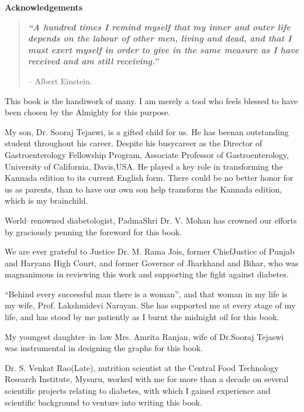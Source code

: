 \thispagestyle{empty}

\begin{center}
\Huge\textbf{Acknowledgements}
\end{center}

\vskip 20pt

\begin{quote}
\textbf{\textit{“A hundred times I remind myself that my inner and outer life depends on the labour of other men, living and dead, and that I must exert myself in order to give in the same measure as I have received and am still receiving.”}}
\begin{flushright}
– Albert Einstein.
\end{flushright}
\end{quote}

This book is the handiwork of many. I am merely a tool who feels blessed to have been chosen by the Almighty for this purpose.

My son, Dr. Sooraj Tejaswi, is a gifted child for us. He has been\break an outstanding student throughout his career. Despite his busy\break career as the Director of Gastroenterology Fellowship Program, Asso\-ciate Professor of Gastroenterology, University of California, Davis,\break USA. He played a key role in transforming the Kannada edition to its current English form. There could be no better honor for us as parents, than to have our own son help transform the Kannada edition, which is my brainchild.

World–renowned diabetologist, PadmaShri Dr. V. Mohan has crow\-ned our efforts by graciously penning the foreword for this book.

We are ever grateful to Justice Dr. M. Rama Jois, former Chief\break Justice of Punjab and Haryana High Court, and former Governor of Jharkhand and Bihar, who was magnanimous in reviewing this work and supporting the fight against diabetes.

“Behind every successful man there is a woman”, and that woman in my life is my wife, Prof. Lakshmidevi Narayan. She has supported me at every stage of my life, and has stood by me patiently as I burnt the midnight oil for this book.

My youngest daughter–in–law Mrs. Amrita Ranjan, wife of Dr.Sooraj Tejaswi was instrumental in designing the graphs for this book.

Dr. S. Venkat Rao(Late), nutrition scientist at the Central Food Technology Research Institute, Mysuru, worked with me for more than a decade on several scientific projects relating to diabetes, with which I gained experience and scientific background to venture into writing this book.

